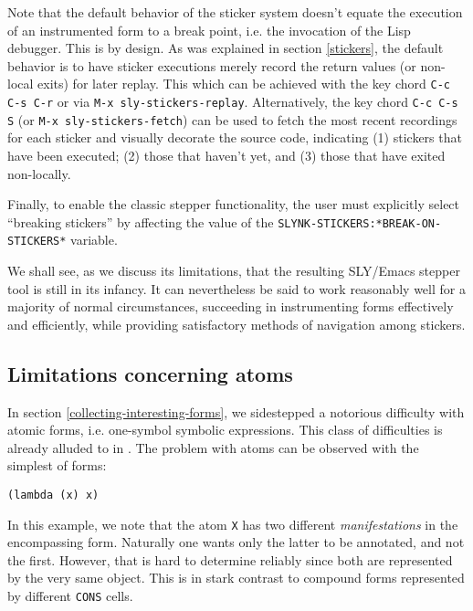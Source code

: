 \documentclass[sigconf]{acmart}
\begin{document}
Note that the default behavior of the sticker system doesn't equate
the execution of an instrumented form to a break point, i.e. the
invocation of the Lisp debugger.  This is by design.  As was explained
in section \ref{stickers}, the default behavior is to have sticker
executions merely record the return values (or non-local exits) for
later replay.  This which can be achieved with the key chord
\texttt{C-c C-s C-r} or via \texttt{M-x sly-stickers-replay}.
Alternatively, the key chord \texttt{C-c C-s S} (or \texttt{M-x
  sly-stickers-fetch}) can be used to fetch the most recent recordings
for each sticker and visually decorate the source code, indicating (1)
stickers that have been executed; (2) those that haven't yet, and (3)
those that have exited non-locally.

Finally, to enable the classic stepper functionality, the user must
explicitly select ``breaking stickers'' by affecting the value of the
\texttt{SLYNK-STICKERS:*BREAK-ON-STICKERS*} variable.

We shall see, as we discuss its limitations, that the resulting
SLY/Emacs stepper tool is still in its infancy.  It can nevertheless
be said to work reasonably well for a majority of normal
circumstances, succeeding in instrumenting forms effectively and
efficiently, while providing satisfactory methods of navigation among
stickers.

\subsection{Limitations concerning atoms}\label{atoms}

In section \ref{collecting-interesting-forms}, we sidestepped a
notorious difficulty with atomic forms, i.e. one-symbol symbolic
expressions.  This class of difficulties is already alluded to in
\cite[I-4.8]{annotation-based}.  The problem with atoms can be
observed with the simplest of forms:

\begin{verbatim}
(lambda (x) x)
\end{verbatim}

In this example, we note that the atom \texttt{X} has two different
\emph{manifestations} in the encompassing form.  Naturally one wants
only the latter to be annotated, and not the first.  However, that is
hard to determine reliably since both are represented by the very same
object.  This is in stark contrast to compound forms represented by
different \texttt{CONS} cells.
\end{document}
